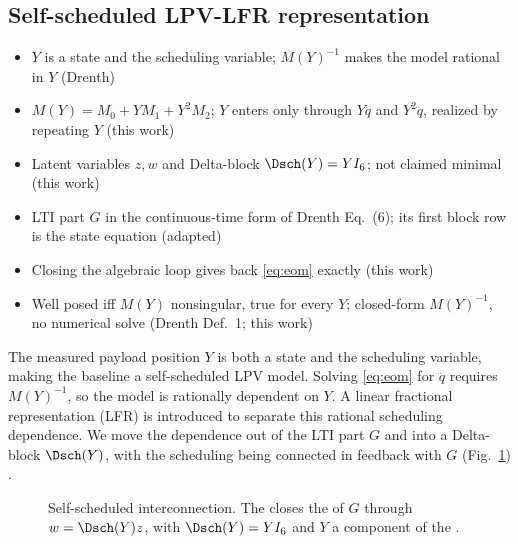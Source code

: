 \subsection{Self-scheduled LPV-LFR representation}\label{sec:lfr}
\ifdraft
\begin{itemize}
\item $Y$ is a state and the scheduling variable; $M(Y)^{-1}$ makes the model rational in $Y$ (Drenth)
\item $M(Y)=M_0+YM_1+Y^2M_2$; $Y$ enters only through $Y\ddot q$ and $Y^2\ddot q$, realized by repeating $Y$ (this work)
\item Latent variables $z,w$ and Delta-block $\Dsch(Y)=YI_6$; not claimed minimal (this work)
\item LTI part $G$ in the continuous-time form of Drenth Eq.~(6); its first block row is the state equation (adapted)
\item Closing the algebraic loop gives back \eqref{eq:eom} exactly (this work)
\item Well posed iff $M(Y)$ nonsingular, true for every $Y$; closed-form $M(Y)^{-1}$, no numerical solve (Drenth Def.~1; this work)
\end{itemize}
\fi
The measured payload position $Y$ is both a state and the scheduling variable,
making the baseline a self-scheduled LPV model.
Solving \eqref{eq:eom} for $\ddot q$ requires $M(Y)^{-1}$, so the model
is rationally dependent on $Y$. A linear fractional representation (LFR) is introduced to separate this rational scheduling dependence.
We move the dependence out of the LTI part $G$ and into a Delta-block $\Dsch(Y)$, 
with the scheduling being connected in feedback with $G$ (Fig.~\ref{fig:lfr}) \cite{drenth2025lpvlfr,hoekstra2026lfr}.


\begin{figure}[t]
  \centering
  
  \caption{Self-scheduled  interconnection. The  closes
  the  of $G$ through $w=\Dsch(Y)z$, with
  $\Dsch(Y)=YI_6$ and $Y$ a component of the .}
  \label{fig:lfr}
\end{figure}

